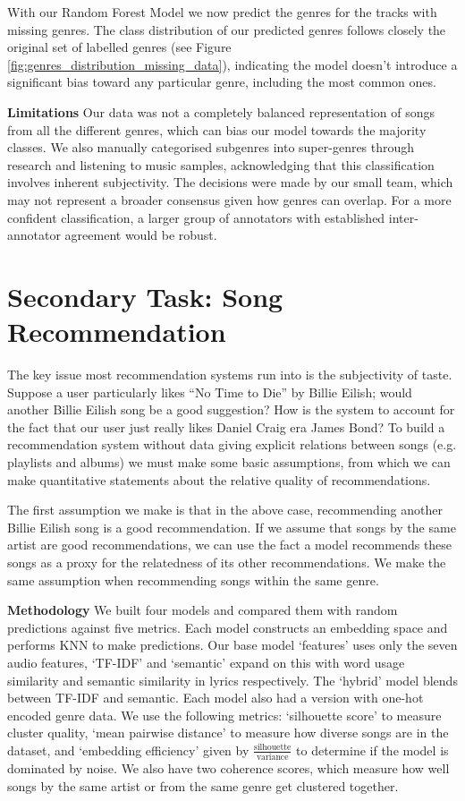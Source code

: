 \documentclass{article}
\newcommand{\minisection}[1]{\textbf{#1}\quad}
\begin{document}
With our Random Forest Model we now predict the genres for the tracks with missing genres. The class distribution of our predicted genres follows closely the original set of labelled genres (see Figure \ref{fig:genres_distribution_missing_data}), indicating the model doesn't introduce a significant bias toward any particular genre, including the most common ones.


\minisection{Limitations} Our data was not a completely balanced representation of songs from all the different genres, which can bias our model towards the majority classes. We also manually categorised subgenres into super-genres through research and listening to music samples, acknowledging that this classification involves inherent subjectivity. The decisions were made by our small team, which may not represent a broader consensus given how genres can overlap. For a more confident classification, a larger group of annotators with established inter-annotator agreement would be robust. 

\vspace{-3mm}
\section{Secondary Task: Song Recommendation}\label{task:song-recommendation}
\vspace{-3mm}
The key issue most recommendation systems run into is the subjectivity of taste. Suppose a user particularly likes \enquote{No Time to Die} by Billie Eilish; would another Billie Eilish song be a good suggestion? How is the system to account for the fact that our user just really likes Daniel Craig era James Bond? To build a recommendation system without data giving explicit relations between songs (e.g. playlists and albums) we must make some basic assumptions, from which we can make quantitative statements about the relative quality of recommendations.

The first assumption we make is that in the above case, recommending another Billie Eilish song is a good recommendation. If we assume that songs by the same artist are good recommendations, we can use the fact a model recommends these songs as a proxy for the relatedness of its other recommendations. We make the same assumption when recommending songs within the same genre.

\minisection{Methodology} We built four models and compared them with random predictions against five metrics. Each model constructs an embedding space and performs KNN to make predictions. Our base model `features' uses only the seven audio features, `TF-IDF' and `semantic' expand on this with word usage similarity and semantic similarity in lyrics respectively. The `hybrid' model blends between TF-IDF and semantic. Each model also had a version with one-hot encoded genre data. We use the following metrics: `silhouette score' to measure cluster quality, `mean pairwise distance' to measure how diverse songs are in the dataset, and `embedding efficiency' given by $\frac{\text{silhouette}}{\text{variance}}$ to determine if the model is dominated by noise. We also have two coherence scores, which measure how well songs by the same artist or from the same genre get clustered together.
\end{document}
